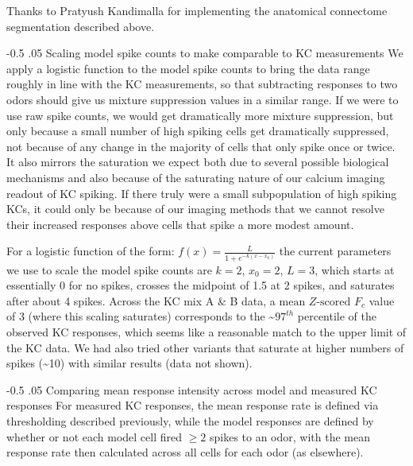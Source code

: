 \documentclass[12pt]{caltech_thesis}
\makeatletter
\let\Oldsubsubsection\subsubsection
\renewcommand{\subsubsection}{\FloatBarrier\Oldsubsubsection}
\renewcommand\subsubsection{%
    \@startsection{subsubsection}{4}{0mm}%
       {-0.5\baselineskip}%
       {.05\baselineskip}%
       {\normalfont\normalsize\bfseries\itshape}}
\newcommand{\KCRespStat}{\ensuremath{\text{mean }\mathit{Z}\text{-scored $F_c$}}}
\makeatother
\begin{document}
\begin{refsection}
Thanks to Pratyush Kandimalla for implementing the anatomical connectome segmentation described above.

\subsubsection{Scaling model spike counts to make comparable to KC measurements}
\label{sssec:scaling_spike_counts}
We apply a logistic function to the model spike counts to bring the data range roughly in line with the KC measurements, so that subtracting responses to two odors should give us mixture suppression values in a similar range.
If we were to use raw spike counts, we would get dramatically more mixture suppression, but only because a small number of high spiking cells get dramatically suppressed, not because of any change in the majority of cells that only spike once or twice.
It also mirrors the saturation we expect both due to several possible biological mechanisms and also because of the saturating nature of our calcium imaging readout of KC spiking.
If there truly were a small subpopulation of high spiking KCs, it could only be because of our imaging methods that we cannot resolve their increased responses above cells that spike a more modest amount.

For a logistic function of the form: $f(x) = \frac{L}{1 + e^{-k(x-x_0)}}$ the current parameters we use to scale the model spike counts are $k=2$, $x_0=2$, $L=3$, which starts at essentially 0 for no spikes, crosses the midpoint of 1.5 at 2 spikes, and saturates after about 4 spikes.
Across the KC mix A \& B data, a \KCRespStat{ }value of 3 (where this scaling saturates) corresponds to the \textasciitilde$97^{th}$ percentile of the observed KC responses, which seems like a reasonable match to the upper limit of the KC data.
We had also tried other variants that saturate at higher numbers of spikes (\textasciitilde10) with similar results (data not shown).

\subsubsection{Comparing mean response intensity across model and measured KC responses}
\label{sssec:model_vs_kc_intensity}
For measured KC responses, the mean response rate is defined via thresholding described previously, while the model responses are defined by whether or not each model cell fired $\geq2$ spikes to an odor, with the mean response rate then calculated across all cells for each odor (as elsewhere).


\end{refsection}
\end{document}
